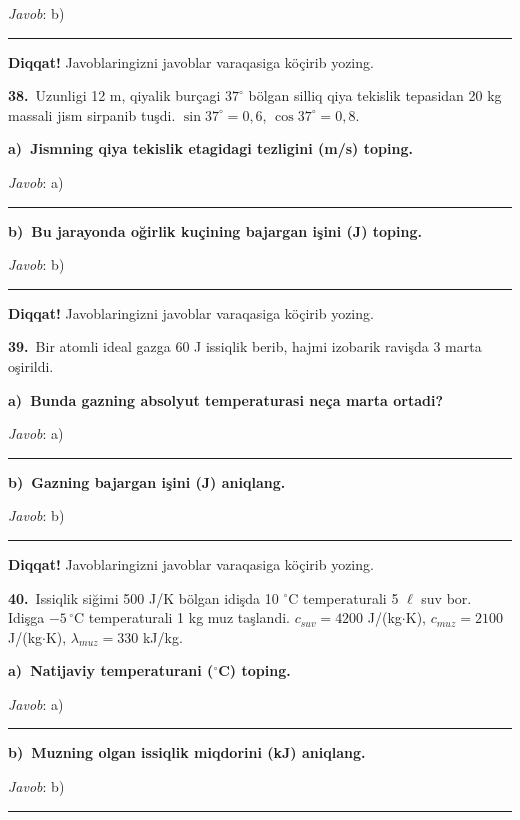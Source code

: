 \documentclass[11pt,a4paper]{article}
\newcommand{\blank}{\rule{5cm}{0.4pt}}
\begin{document}
\noindent\textit{Javob}: b)\ \blank\par
\medskip\noindent\textbf{Diqqat!} Javoblaringizni javoblar varaqasiga köçirib yozing.\par\vspace{10pt}
\noindent\textbf{38.}\ Uzunligi 12 m, qiyalik burçagi $37^\circ$ bölgan silliq qiya tekislik tepasidan 20 kg massali jism sirpanib tuşdi. $\sin37^\circ=0,6$, $\cos37^\circ=0,8$.\par\smallskip
\medskip\noindent\textbf{a)\ Jismning qiya tekislik etagidagi tezligini (m/s) toping.}\par
\noindent\textit{Javob}: a)\ \blank\par
\medskip\noindent\textbf{b)\ Bu jarayonda oğirlik kuçining bajargan işini (J) toping.}\par
\noindent\textit{Javob}: b)\ \blank\par
\medskip\noindent\textbf{Diqqat!} Javoblaringizni javoblar varaqasiga köçirib yozing.\par\vspace{10pt}
\noindent\textbf{39.}\ Bir atomli ideal gazga 60 J issiqlik berib, hajmi izobarik ravişda 3 marta oşirildi.\par\smallskip
\medskip\noindent\textbf{a)\ Bunda gazning absolyut temperaturasi neça marta ortadi?}\par
\noindent\textit{Javob}: a)\ \blank\par
\medskip\noindent\textbf{b)\ Gazning bajargan işini (J) aniqlang.}\par
\noindent\textit{Javob}: b)\ \blank\par
\medskip\noindent\textbf{Diqqat!} Javoblaringizni javoblar varaqasiga köçirib yozing.\par\vspace{10pt}
\noindent\textbf{40.}\ Issiqlik siğimi 500 J/K bölgan idişda 10 $^\circ$C temperaturali 5 $\ell$ suv bor. Idişga $-5\,^\circ$C temperaturali 1 kg muz taşlandi. $c_{suv}=4200$ J/(kg$\cdot$K), $c_{muz}=2100$ J/(kg$\cdot$K), $\lambda_{muz}=330$ kJ/kg.\par\smallskip
\medskip\noindent\textbf{a)\ Natijaviy temperaturani ($^\circ$C) toping.}\par
\noindent\textit{Javob}: a)\ \blank\par
\medskip\noindent\textbf{b)\ Muzning olgan issiqlik miqdorini (kJ) aniqlang.}\par
\noindent\textit{Javob}: b)\ \blank\par
\end{document}
